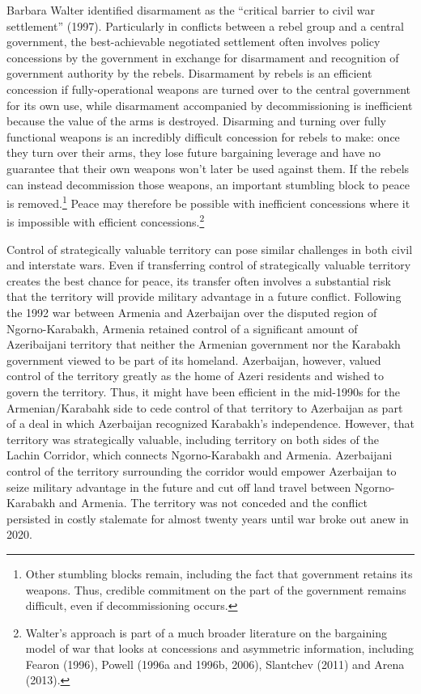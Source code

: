 \documentclass[12pt, letterpaper]{article}
\begin{document}
Barbara Walter identified disarmament as the ``critical barrier to civil war settlement'' (1997). Particularly in conflicts between a rebel group and a central government, the best-achievable negotiated settlement often involves policy concessions by the government in exchange for disarmament and recognition of government authority by the rebels. Disarmament by rebels is an efficient concession if fully-operational weapons are turned over to the central government for its own use, while disarmament accompanied by decommissioning is inefficient because the value of the arms is destroyed. Disarming and turning over fully functional weapons is an incredibly difficult concession for rebels to make: once they turn over their arms, they lose future bargaining leverage and have no guarantee that their own weapons won't later be used against them. If the rebels can instead decommission those weapons, an important stumbling block to peace is removed.\footnote{Other stumbling blocks remain, including the fact that government retains its weapons. Thus, credible commitment on the part of the government remains difficult, even if decommissioning occurs.} Peace may therefore be possible with inefficient concessions where it is impossible with efficient concessions.\footnote{Walter's approach is part of a much broader literature on the bargaining model of war that looks at concessions and asymmetric information, including  Fearon (1996), Powell (1996a and 1996b, 2006), Slantchev (2011) and Arena (2013).}

Control of strategically valuable territory can pose similar challenges in both civil and interstate wars. Even if transferring control of strategically valuable territory creates the best chance for peace, its transfer often involves a substantial risk that the territory will provide military advantage in a future conflict. Following the 1992 war between Armenia and Azerbaijan over the disputed region of Ngorno-Karabakh, Armenia retained control of a significant amount of Azeribaijani territory that neither the Armenian government nor the Karabakh government viewed to be part of its homeland. Azerbaijan, however, valued control of the territory greatly as the home of Azeri residents and wished to govern the territory. Thus, it might have been efficient in the mid-1990s for the Armenian/Karabahk side to cede control of that territory to Azerbaijan as part of a deal in which Azerbaijan recognized Karabakh's independence.  However, that territory was strategically valuable, including territory on both sides of the Lachin Corridor, which connects Ngorno-Karabakh and Armenia. Azerbaijani control of the territory surrounding the corridor would empower Azerbaijan to seize military advantage in the future and cut off land travel between Ngorno-Karabakh and Armenia.  The territory was not conceded and the conflict persisted in costly stalemate for almost twenty years until war broke out anew in 2020. 
\end{document}
